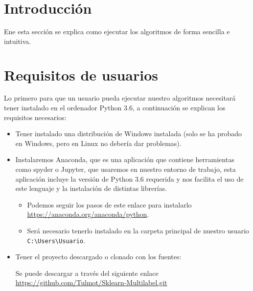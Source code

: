 \label{fig:graphviz}
\section{Introducción}
Ene esta sección se explica como ejecutar los algoritmos de forma sencilla e intuitiva.

\section{Requisitos de usuarios}
Lo primero para que un usuario pueda ejecutar nuestro algoritmos necesitará tener instalado en el ordenador Python 3.6, a continuación se explican los requisitos necesarios:
\begin{itemize}
	\item Tener instalado una distribución de Windows instalada (solo se ha probado en Windows, pero en Linux no debería dar problemas).
	\item Instalaremos Anaconda, que es una aplicación que contiene herramientas como spyder o Jupyter, que usaremos en nuestro entorno de trabajo, esta aplicación incluye la versión de Python 3.6 requerida y nos facilita el uso de este lenguaje y la instalación de distintas librerías.
	\begin{itemize}
		\item Podemos seguir los pasos de este enlace para instalarlo \url{https://anaconda.org/anaconda/python}.		
    	\item Será necesario tenerlo instalado en la carpeta principal de nuestro usuario \texttt{C:\textbackslash Users\textbackslash Usuario}.
	\end{itemize}
\item Tener el proyecto descargado o clonado con los fuentes: 

Se puede descargar a través del siguiente enlace \url{https://github.com/Tulmot/Sklearn-Multilabel.git}
\end{itemize}


